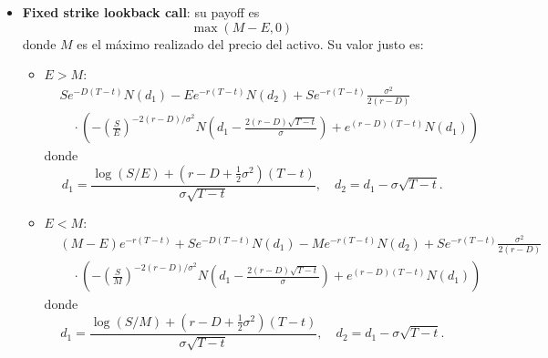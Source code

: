 \begin{itemize}
    \item \textbf{Fixed strike lookback call}: su payoff es
    \begin{equation*}
        \max(M-E, 0)
    \end{equation*}
    donde $M$ es el máximo realizado del precio del activo. Su valor justo es:
    \begin{itemize}
        \item $E > M$:
        \begin{equation*}
            \boxed{
                \begin{aligned}
                    & Se^{-D(T-t)} N(d_1) - Ee^{-r(T-t)} N(d_2) + Se^{-r(T-t)} \frac{\sigma^2}{2(r-D)} \\
                    & \quad \cdot \left( -\left( \frac{S}{E} \right)^{-2(r-D)/\sigma^2} N\left(d_1 - \frac{2(r-D)\sqrt{T-t}}{\sigma}\right) + e^{(r-D)(T-t)} N(d_1) \right)
                \end{aligned}
            }
        \end{equation*}
        donde
        \begin{equation*}
            d_1 = \frac{\log(S/E) + (r-D + \frac{1}{2}\sigma^2)(T-t)}{\sigma\sqrt{T-t}}, \quad d_2 = d_1 - \sigma\sqrt{T-t}.
        \end{equation*}

        \item $E < M$:
        \begin{equation*}
            \boxed{
                \begin{aligned}
                    & (M-E)e^{-r(T-t)} + Se^{-D(T-t)} N(d_1) - Me^{-r(T-t)} N(d_2) + Se^{-r(T-t)} \frac{\sigma^2}{2(r-D)} \\
                    & \quad \cdot \left( -\left( \frac{S}{M} \right)^{-2(r-D)/\sigma^2} N\left(d_1 - \frac{2(r-D)\sqrt{T-t}}{\sigma}\right) + e^{(r-D)(T-t)} N(d_1) \right)
                \end{aligned}
            }
        \end{equation*}
        donde
        \begin{equation*}
            d_1 = \frac{\log(S/M) + (r-D + \frac{1}{2}\sigma^2)(T-t)}{\sigma\sqrt{T-t}}, \quad d_2 = d_1 - \sigma\sqrt{T-t}.
        \end{equation*}
    \end{itemize}


\end{itemize}
